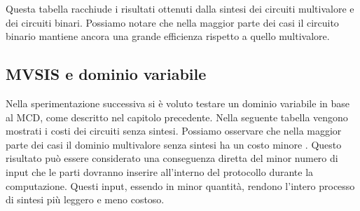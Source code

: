 \documentclass[
]{book}
\begin{document}
Questa tabella racchiude i risultati ottenuti dalla sintesi dei circuiti multivalore e dei circuiti binari. Possiamo notare che nella maggior parte dei casi il circuito binario mantiene ancora una grande efficienza rispetto a quello multivalore.

\hypertarget{mvsis-e-dominio-variabile}{%
\subsection{MVSIS e dominio variabile}\label{mvsis-e-dominio-variabile}}

Nella sperimentazione successiva si è voluto testare un dominio variabile in base al MCD, come descritto nel capitolo precedente. Nella seguente tabella vengono mostrati i costi dei circuiti senza sintesi. Possiamo osservare che nella maggior parte dei casi il dominio multivalore senza sintesi ha un costo minore . Questo risultato può essere considerato una conseguenza diretta del minor numero di input che le parti dovranno inserire all'interno del protocollo durante la computazione. Questi input, essendo in minor quantità, rendono l'intero processo di sintesi più leggero e meno costoso.
\end{document}
